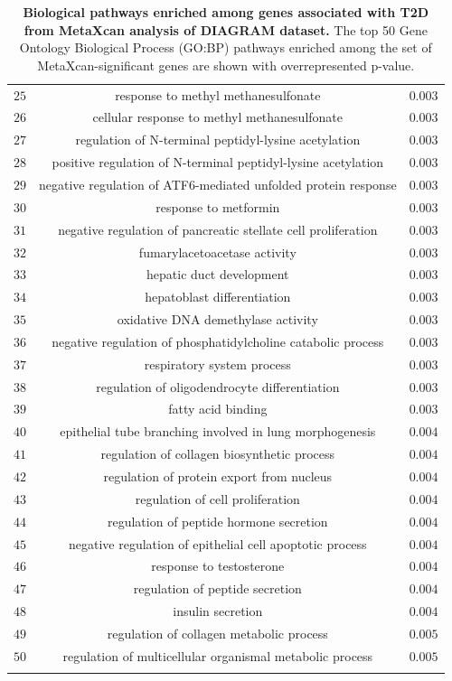 \documentclass[10pt]{article}
\begin{document}
\begin{table}[!htbp]
{\begin{tabular}{@{\extracolsep{5pt}} ccc}
$25$ & response to methyl methanesulfonate & $0.003$ \\ 
$26$ & cellular response to methyl methanesulfonate & $0.003$ \\ 
$27$ & regulation of N-terminal peptidyl-lysine acetylation & $0.003$ \\ 
$28$ & positive regulation of N-terminal peptidyl-lysine acetylation & $0.003$ \\ 
$29$ & negative regulation of ATF6-mediated unfolded protein response & $0.003$ \\ 
$30$ & response to metformin & $0.003$ \\ 
$31$ & negative regulation of pancreatic stellate cell proliferation & $0.003$ \\ 
$32$ & fumarylacetoacetase activity & $0.003$ \\ 
$33$ & hepatic duct development & $0.003$ \\ 
$34$ & hepatoblast differentiation & $0.003$ \\ 
$35$ & oxidative DNA demethylase activity & $0.003$ \\ 
$36$ & negative regulation of phosphatidylcholine catabolic process & $0.003$ \\ 
$37$ & respiratory system process & $0.003$ \\ 
$38$ & regulation of oligodendrocyte differentiation & $0.003$ \\ 
$39$ & fatty acid binding & $0.003$ \\ 
$40$ & epithelial tube branching involved in lung morphogenesis & $0.004$ \\ 
$41$ & regulation of collagen biosynthetic process & $0.004$ \\ 
$42$ & regulation of protein export from nucleus & $0.004$ \\ 
$43$ & regulation of cell proliferation & $0.004$ \\ 
$44$ & regulation of peptide hormone secretion & $0.004$ \\ 
$45$ & negative regulation of epithelial cell apoptotic process & $0.004$ \\ 
$46$ & response to testosterone & $0.004$ \\ 
$47$ & regulation of peptide secretion & $0.004$ \\ 
$48$ & insulin secretion & $0.004$ \\ 
$49$ & regulation of collagen metabolic process & $0.005$ \\ 
$50$ & regulation of multicellular organismal metabolic process & $0.005$ \\ 
\hline \\[-1.8ex] 
\end{tabular} 
}
\caption{\textbf{Biological pathways enriched among genes associated with T2D from MetaXcan analysis of DIAGRAM dataset.} The top 50 Gene Ontology Biological Process (GO:BP) pathways enriched among the set of MetaXcan-significant genes are shown with overrepresented p-value.} 
\end{table} 
\end{document}
